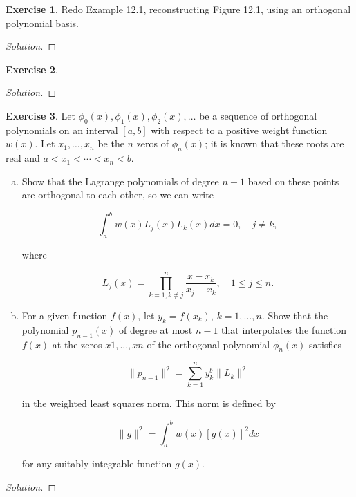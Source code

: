 \documentclass[12pt,a4]{article}
\theoremstyle{definition}
\newtheorem{exercise}{Exercise}
\begin{document}
\begin{exercise}
	Redo Example 12.1, reconstructing Figure 12.1, using an orthogonal polynomial basis.
\end{exercise}
\begin{proof}[Solution]
	
\end{proof}

\begin{exercise}
	
\end{exercise}
\begin{proof}[Solution]
	
\end{proof}

\begin{exercise}
	Let $\phi_0(x), \phi_1(x), \phi_2(x), \ldots$ be a sequence of orthogonal polynomials on an interval $[a, b]$ with respect to a positive weight function $w(x)$. Let $x_1, \ldots, x_n$ be the $n$ zeros of $\phi_n(x)$; it is known that these roots are real and $a < x_1 < \cdots < x_n < b$.
	
	\begin{enumerate}[(a)]
		\item Show that the Lagrange polynomials of degree $n - 1$ based on these points are orthogonal to each other, so we can write
		
		\[
		\int_a^b w(x) L_j(x) L_k(x) dx = 0 {,} \quad j \neq k {,}
		\]
		
		\noindent where
		
		\[
		L_j(x) = \prod_{k = 1, k \neq j}^{n} \frac{x - x_k}{x_j - x_k} {,} \quad 1 \leq j \leq n {.}
		\]
		
		
		\item For a given function $f(x)$, let $y_k = f (x_k)$, $k = 1, \ldots, n$. Show that the polynomial $p_{n - 1}(x)$ of degree at most $n - 1$ that interpolates the function $f(x)$ at the zeros $x1,...,xn$ of the orthogonal polynomial $\phi_n(x)$ satisfies
		
		\[
		\| p_{n - 1} \|^2 = \sum_{k = 1}^n y_k^b \| L_k \|^2
		\]
		
		\noindent in the weighted least squares norm. This norm is defined by 
		
		\[
		\| g \|^2 = \int_a^b w(x) [g(x)]^2 dx
		\]
		
		\noindent for any suitably integrable function $g(x)$. 
	\end{enumerate}
\end{exercise}
\begin{proof}[Solution]
	
\end{proof}
\end{document}
